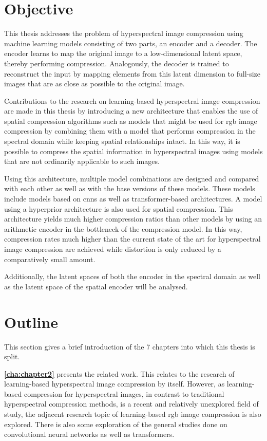 \section{Objective\label{sec:objective}}
This thesis addresses the problem of hyperspectral image compression using machine learning models consisting of two parts, an encoder and a decoder.
The encoder learns to map the original image to a low-dimensional latent space, thereby performing compression. Analogously, the decoder is trained to reconstruct the input by mapping elements from this latent dimension to full-size images that are as close as possible to the original image.

Contributions to the research on learning-based hyperspectral image compression are made in this thesis by introducing a new architecture that enables the use of spatial compression algorithms such as models that might be used for \ac{rgb} image compression by combining them with a model that performs compression in the spectral domain while keeping spatial relationships intact. In this way, it is possible to compress the spatial information in hyperspectral images using models that are not ordinarily applicable to such images.

Using this architecture, multiple model combinations are designed and compared with each other as well as with the base versions of these models.
These models include models based on \acp{cnn} as well as transformer-based architectures.
A model using a hyperprior architecture is also used for spatial compression. This architecture yields much higher compression ratios than other models by using an arithmetic encoder in the bottleneck of the compression model. In this way, compression rates much higher than the current state of the art for hyperspectral image compression are achieved while distortion is only reduced by a comparatively small amount. 

Additionally, the latent spaces of both the encoder in the spectral domain as well as the latent space of the spatial encoder will be analysed.

\section{Outline\label{sec:outline}}
This section gives a brief introduction of the 7 chapters into which this thesis is split.

\textbf{\autoref{cha:chapter2}} presents the related work. This relates to the research of learning-based hyperspectral image compression by itself. However, as learning-based compression for hyperspectral images, in contrast to traditional hyperspectral compression methods, is a recent and relatively unexplored field of study, the adjacent research topic of learning-based \ac{rgb} image compression is also explored. There is also some exploration of the general studies done on convolutional neural networks as well as transformers.

